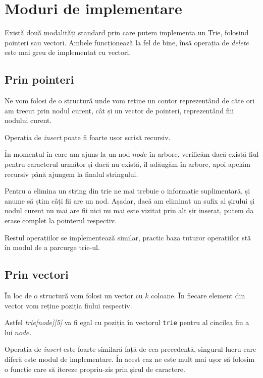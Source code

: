 \section{Moduri de implementare}
Există două modalități standard prin care putem implementa un Trie, folosind pointeri sau vectori. Ambele funcționează la fel de bine, însă operația de \textit{delete} este mai greu de implementat cu vectori.

\subsection{Prin pointeri}
Ne vom folosi de o structură unde vom reține un contor reprezentând de câte ori am trecut prin nodul curent, cât și un vector de pointeri, reprezentând fiii nodului curent.

Operația de \textit{insert} poate fi foarte ușor scrisă recursiv.

În momentul în care am ajuns la un nod $node$ în arbore, verificăm dacă există fiul pentru caracterul următor și dacă nu există, îl adăugăm în arbore, apoi apelăm recursiv până ajungem la finalul stringului. 

Pentru a elimina un string din trie ne mai trebuie o informație suplimentară, și anume să știm câți fii are un nod. Așadar, dacă am eliminat un sufix al șirului și nodul curent nu mai are fii nici nu mai este vizitat prin alt șir inserat, putem da erase complet la pointerul respectiv. 

Restul operațiilor se implementează similar, practic baza tuturor operațiilor stă în modul de a parcurge trie-ul.

\subsection{Prin vectori}
În loc de o structură vom folosi un vector cu $k$ coloane. În fiecare element din vector vom reține poziția fiului respectiv.

Astfel \textit{trie[node][5]} va fi egal cu poziția în vectorul \texttt{trie} pentru al cincilea fiu a lui $node$.

Operația de \textit{insert} este foarte similară față de cea precedentă, singurul lucru care diferă este modul de implementare. În acest caz ne este mult mai ușor să folosim o funcție care să itereze propriu-zis prin șirul de caractere.

